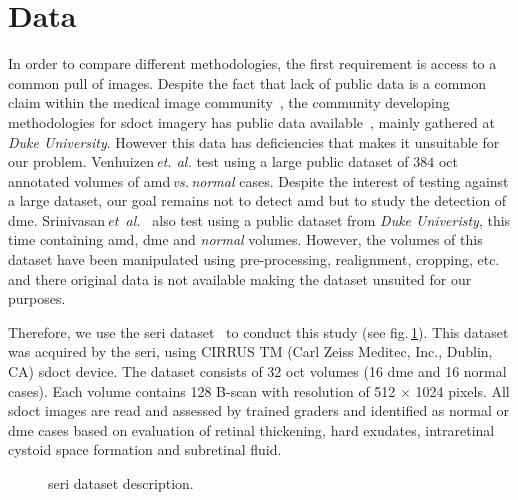 \graphicspath{ {./content/method/figures/} }

\section{Data}\label{sec:data}
In order to compare different methodologies, the first requirement is access to a common pull of images.
Despite the fact that lack of public data is a common claim within the medical image community~\cite{giger2008anniversary}, the community developing methodologies for \gls{sdoct} imagery has public data available~\cite{farsiu2014quantitative,Srinivasan2014}, mainly gathered at \emph{Duke University}.
However this data has deficiencies that makes it unsuitable for our problem.
Venhuizen\,\emph{et. al.} test using a large public dataset of $384$ \gls{oct} annotated volumes of \gls{amd}\,\emph{vs.\,normal} cases.
Despite the interest of testing against a large dataset, our goal remains not to detect \gls{amd} but to study the detection of \gls{dme}.
Srinivasan\,\textit{et~al.}~\cite{Srinivasan2014} also test using a public dataset from \emph{Duke Univeristy}, this time containing \gls{amd}, \gls{dme} and \emph{normal} volumes.
However, the volumes of this dataset have been manipulated using pre-processing, realignment, cropping, etc. and there original data is not available making the dataset unsuited for our purposes.

Therefore, we use the \gls{seri} dataset~\cite{seri2016apr-repoICPR} to conduct this study (see fig.\,\ref{fig:bbdd}).
This dataset was acquired by the \gls{seri}, using CIRRUS TM (Carl Zeiss Meditec, Inc., Dublin, CA) \gls{sdoct} device.
The dataset consists of 32 \gls{oct} volumes (16 \gls{dme} and 16 normal cases).
Each volume contains 128 B-scan with resolution of 512 $\times$ 1024 pixels.  All \gls{sdoct} images are read and assessed by trained graders and identified as normal or \gls{dme} cases based on evaluation of retinal thickening, hard exudates, intraretinal cystoid space formation and subretinal fluid.

\begin{figure}
    \caption{\gls{seri} dataset description.}
  \label{fig:bbdd}
\end{figure}
